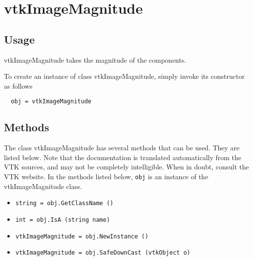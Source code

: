 \section{vtkImageMagnitude}

\subsection{Usage}

 vtkImageMagnitude takes the magnitude of the components.

To create an instance of class vtkImageMagnitude, simply
invoke its constructor as follows
\begin{verbatim}
  obj = vtkImageMagnitude
\end{verbatim}
\subsection{Methods}

The class vtkImageMagnitude has several methods that can be used.
  They are listed below.
Note that the documentation is translated automatically from the VTK sources,
and may not be completely intelligible.  When in doubt, consult the VTK website.
In the methods listed below, \verb|obj| is an instance of the vtkImageMagnitude class.
\begin{itemize}
\item  \verb|string = obj.GetClassName ()|

\item  \verb|int = obj.IsA (string name)|

\item  \verb|vtkImageMagnitude = obj.NewInstance ()|

\item  \verb|vtkImageMagnitude = obj.SafeDownCast (vtkObject o)|

\end{itemize}
